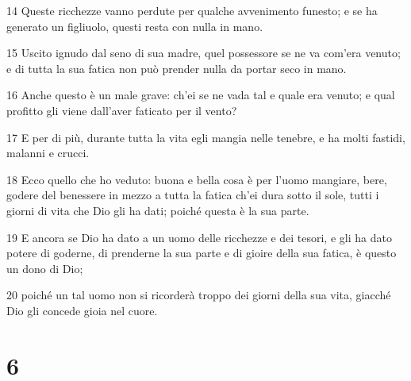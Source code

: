 \par 14 Queste ricchezze vanno perdute per qualche avvenimento funesto; e se ha generato un figliuolo, questi resta con nulla in mano.
\par 15 Uscito ignudo dal seno di sua madre, quel possessore se ne va com'era venuto; e di tutta la sua fatica non può prender nulla da portar seco in mano.
\par 16 Anche questo è un male grave: ch'ei se ne vada tal e quale era venuto; e qual profitto gli viene dall'aver faticato per il vento?
\par 17 E per di più, durante tutta la vita egli mangia nelle tenebre, e ha molti fastidi, malanni e crucci.
\par 18 Ecco quello che ho veduto: buona e bella cosa è per l'uomo mangiare, bere, godere del benessere in mezzo a tutta la fatica ch'ei dura sotto il sole, tutti i giorni di vita che Dio gli ha dati; poiché questa è la sua parte.
\par 19 E ancora se Dio ha dato a un uomo delle ricchezze e dei tesori, e gli ha dato potere di goderne, di prenderne la sua parte e di gioire della sua fatica, è questo un dono di Dio;
\par 20 poiché un tal uomo non si ricorderà troppo dei giorni della sua vita, giacché Dio gli concede gioia nel cuore.

\chapter{6}

